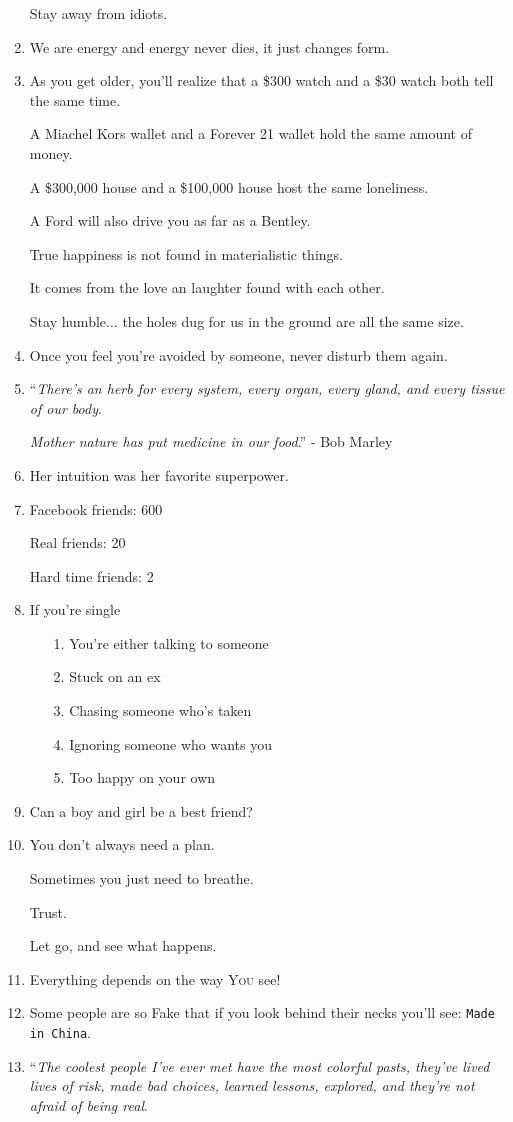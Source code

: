 \documentclass{article}
\begin{document}
\begin{enumerate}
	Stay away from idiots.
	\item We are energy and energy never dies, it just changes form.
	\item As you get older, you'll realize that a \$300 watch and a \$30 watch both tell the same time.
	
	A Miachel Kors wallet and a Forever 21 wallet hold the same amount of money.
	
	A \$300,000 house and a \$100,000 house host the same loneliness.
	
	A Ford will also drive you as far as a Bentley.
	
	True happiness is not found in materialistic things.
	
	It comes from the love an laughter found with each other.
	
	Stay humble$\ldots$ the holes dug for us in the ground are all the same size.
	\item Once you feel you're avoided by someone, never disturb them again.
	\item ``\textit{There's an herb for every system, every organ, every gland, and every tissue of our body}.
	
	\textit{Mother nature has put medicine in our food}.'' - Bob Marley
	\item Her intuition was her favorite superpower.
	\item Facebook friends: 600
	
	Real friends: 20
	
	Hard time friends: 2
	\item If you're single
	\begin{itemize}
		\item[1.] You're either talking to someone
		\item[2.] Stuck on an ex
		\item[3.] Chasing someone who's taken
		\item[4.] Ignoring someone who wants you
		\item[5.] Too happy on your own
	\end{itemize}
	\item Can a boy and girl be a best friend?
	\item You don't always need a plan.
	
	Sometimes you just need to breathe.
	
	Trust.
	
	Let go, and see what happens.
	\item Everything depends on the way \textsc{You} see!
	\item Some people are so Fake that if you look behind their necks you'll see: \texttt{Made in China}.
	\item ``\textit{The coolest people I've ever met have the most colorful pasts, they've lived lives of risk, made bad choices, learned lessons, explored, and they're not afraid of being real}.
	

\end{enumerate}
\end{document}
